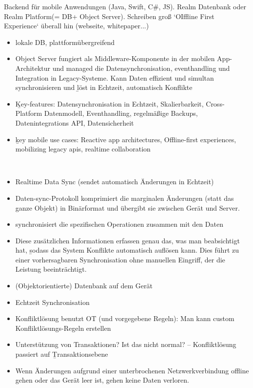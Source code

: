 Backend für mobile Anwendungen (Java, Swift, C\#, JS). Realm Datenbank oder Realm Platform(= DB+ Object Server).
Schreiben groß `OIffline First Experience` überall hin (webseite, whitepaper...)
\begin{itemize}
  \item lokale DB, plattformübergreifend
  \item Object Server fungiert als Middleware-Komponente in der mobilen \gls{App}-Architektur und managed die Datensynchronisation, eventhandling und Integration in Legacy-Systeme. Kann Daten effizient und simultan synchronisieren und \b{löst in Echtzeit, automatisch Konflikte}
  \item \b{Key-features:} Datensynchronisation in Echtzeit, Skalierbarkeit, Cross-Platform Datenmodell, Eventhandling, regelmäßige Backups, Datenintegrations API, Datensicherheit
  \item \b{key mobile use cases:} Reactive app architectures, Offline-first experiences, mobilizing legacy apis, realtime collaboration
\end{itemize}~\cite{realm_whitepaper}

\begin{itemize}
  \item Realtime Data Sync (sendet automatisch Änderungen in Echtzeit)
  \item Daten-sync-Protokoll komprimiert die marginalen Änderungen (statt das ganze Objekt) in Binärformat und übergibt sie zwischen Gerät und Server.
  \item synchronisiert die spezifischen Operationen zusammen mit den Daten
  \item Diese zusätzlichen Informationen erfassen genau das, was man beabsichtigt hat, \b{sodass das System Konflikte automatisch auflösen kann}. Dies führt zu einer vorhersagbaren Synchronisation ohne manuellen Eingriff, der die Leistung beeinträchtigt.
  \item (Objektorientierte) Datenbank auf dem Gerät
  \item Echtzeit Synchronisation
  \item Konfliktlösung benutzt OT (und vorgegebene Regeln): Man kann custom Konfliktlösungs-Regeln erstellen
  \item Unterstützung von Transaktionen? Ist das nicht normal?  -- Konfliktlösung passiert auf \b{Transaktionsebene}
  \item Wenn Änderungen aufgrund einer unterbrochenen Netzwerkverbindung offline gehen oder das Gerät leer ist, gehen keine Daten verloren.
\end{itemize}~\cite{realm_offline_whitepaper}